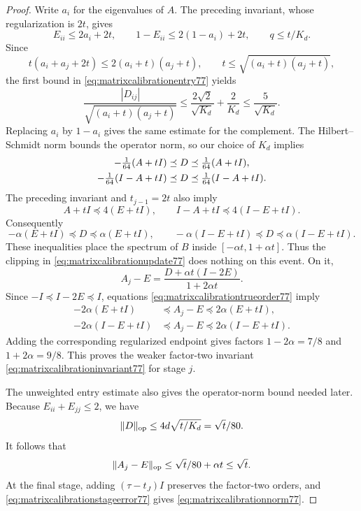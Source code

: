 \begin{proof}
Write $a_i$ for the eigenvalues of $A$.  The preceding invariant,
whose regularization is $2t$, gives
\[
 E_{ii}\le2a_i+2t,
 \qquad 1-E_{ii}\le2(1-a_i)+2t,
 \qquad q\le t/K_d.
\]
Since
\[
 t(a_i+a_j+2t)\le2(a_i+t)(a_j+t),
 \qquad t\le\sqrt{(a_i+t)(a_j+t)},
\]
the first bound in \eqref{eq:matrixcalibrationentry77} yields
\begin{equation}\label{eq:matrixcalibrationnormalized77}
 \frac{|D_{ij}|}{\sqrt{(a_i+t)(a_j+t)}}
 \le\frac{2\sqrt2}{\sqrt{K_d}}+\frac2{K_d}
 \le\frac5{\sqrt{K_d}}.
\end{equation}
Replacing $a_i$ by $1-a_i$ gives the same estimate for the
complement.  The Hilbert--Schmidt norm bounds the operator norm, so
our choice of $K_d$ implies
\begin{align}
 -\tfrac1{64}(A+tI)&\preceq D\preceq\tfrac1{64}(A+tI),\notag\\
 -\tfrac1{64}(I-A+tI)&\preceq D
                            \preceq\tfrac1{64}(I-A+tI).
                                      \label{eq:matrixcalibrationraworder77}
\end{align}
The preceding invariant and $t_{j-1}=2t$ also imply
\[
 A+tI\preceq4(E+tI),\qquad
 I-A+tI\preceq4(I-E+tI).
\]
Consequently
\begin{equation}\label{eq:matrixcalibrationtrueorder77}
 -\alpha(E+tI)\preceq D\preceq\alpha(E+tI),
 \qquad
 -\alpha(I-E+tI)\preceq D\preceq\alpha(I-E+tI).
\end{equation}
These inequalities place the spectrum of $B$ inside
$[-\alpha t,1+\alpha t]$.  Thus the clipping in
\eqref{eq:matrixcalibrationupdate77} does nothing on this event.
On it,
\[
 A_j-E=\frac{D+\alpha t(I-2E)}{1+2\alpha t}.
\]
Since $-I\preceq I-2E\preceq I$, equations
\eqref{eq:matrixcalibrationtrueorder77} imply
\begin{align*}
 -2\alpha(E+tI)&\preceq A_j-E\preceq2\alpha(E+tI),\\
 -2\alpha(I-E+tI)&\preceq A_j-E
                                      \preceq2\alpha(I-E+tI).
\end{align*}
Adding the corresponding regularized endpoint gives factors
$1-2\alpha=7/8$ and $1+2\alpha=9/8$.  This proves the weaker
factor-two invariant \eqref{eq:matrixcalibrationinvariant77} for
stage $j$.

The unweighted entry estimate also gives the operator-norm bound
needed later.  Because $E_{ii}+E_{jj}\le2$, we have
\[
 \|D\|_{\rm op}\le4d\sqrt{t/K_d}=\sqrt t/80.
\]
It follows that
\begin{equation}\label{eq:matrixcalibrationstageerror77}
 \|A_j-E\|_{\rm op}
 \le\sqrt t/80+\alpha t\le\sqrt t.
\end{equation}
At the final stage, adding $(\tau-t_J)I$ preserves the factor-two
orders, and \eqref{eq:matrixcalibrationstageerror77} gives
\eqref{eq:matrixcalibrationnorm77}.


\end{proof}
